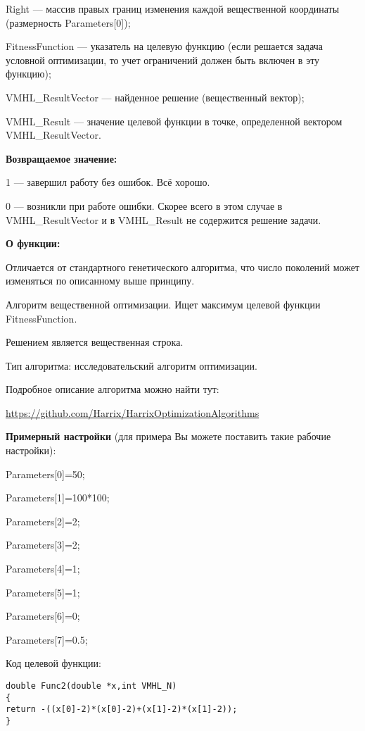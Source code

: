 Right --- массив правых границ изменения каждой вещественной координаты (размерность Parameters[0]);
 
 FitnessFunction --- указатель на целевую функцию (если решается задача условной оптимизации, то учет ограничений должен быть включен в эту функцию);
 
 VMHL\_ResultVector --- найденное решение (вещественный вектор);
 
 VMHL\_Result --- значение целевой функции в точке, определенной вектором VMHL\_ResultVector.

\textbf{Возвращаемое значение:} 

 1 --- завершил работу без ошибок. Всё хорошо.
 
 0 --- возникли при работе ошибки. Скорее всего в этом случае в VMHL\_ResultVector и в VMHL\_Result не содержится решение задачи.

\textbf{О функции:}

Отличается от стандартного генетического алгоритма, что число поколений может изменяться по описанному выше принципу.

Алгоритм вещественной оптимизации. Ищет максимум целевой функции FitnessFunction.

Решением является вещественная строка.

Тип алгоритма: исследовательский алгоритм оптимизации.

Подробное описание алгоритма можно найти тут:

\href{https://github.com/Harrix/HarrixOptimizationAlgorithms/blob/master/\_HarrixOptimizationAlgorithms.pdf}{https://github.com/Harrix/HarrixOptimizationAlgorithms}

\textbf{Примерный настройки} (для примера Вы можете поставить такие рабочие настройки):

 Parameters[0]=50;
 
Parameters[1]=100*100;

Parameters[2]=2;

Parameters[3]=2;

Parameters[4]=1;

Parameters[5]=1;

Parameters[6]=0;

Parameters[7]=0.5;

Код целевой функции:
\begin{lstlisting}[caption=Оптимизируемая функция]
double Func2(double *x,int VMHL_N)
{
return -((x[0]-2)*(x[0]-2)+(x[1]-2)*(x[1]-2));
}
\end{lstlisting}